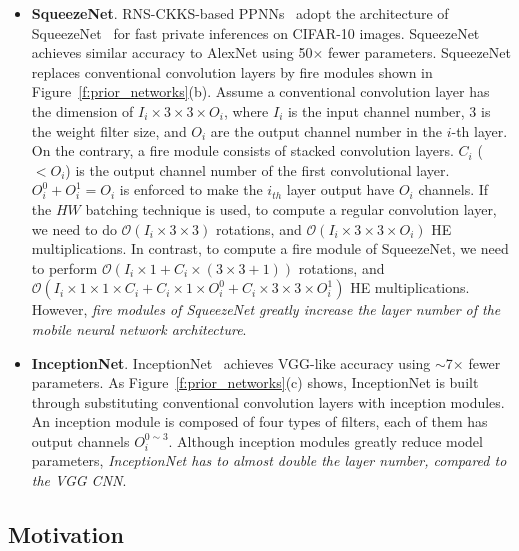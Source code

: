 \documentclass{article}
\begin{document}
\begin{itemize}[noitemsep,topsep=0pt,parsep=0pt,partopsep=0pt,leftmargin=*]


\item \textbf{SqueezeNet}. RNS-CKKS-based PPNNs~\cite{dathathri:2019PLDI,Dathathri:PLDI20:EVA} adopt the architecture of SqueezeNet~\cite{iandola2016squeezenet} for fast private inferences on CIFAR-10 images. SqueezeNet achieves similar accuracy to AlexNet using 50$\times$ fewer parameters. SqueezeNet replaces conventional convolution layers by fire modules shown in Figure~\ref{f:prior_networks}(b). Assume a conventional convolution layer has the dimension of $I_i\times 3 \times 3 \times O_i $, where $I_i$ is the input channel number, $3$ is the weight filter size, and $O_i$ are the output channel number in the $i$-th layer. On the contrary, a fire module consists of stacked convolution layers. $C_i$ ($<O_i$) is the output channel number of the first convolutional layer. $O_{i}^{0}+O_{i}^{1}=O_i$ is enforced to make the $i_{th}$ layer output have $O_i$ channels. If the $HW$ batching technique is used, to compute a regular convolution layer, we need to do $\mathcal{O}(I_i\times 3 \times 3 )$ rotations, and $\mathcal{O}(I_i\times 3 \times 3\times O_i)$ HE multiplications. In contrast, to compute a fire module of SqueezeNet, we need to perform $\mathcal{O}(I_i\times 1 +C_i\times (3 \times 3+1))$ rotations, and $\mathcal{O}(I_i \times 1 \times 1 \times C_i+ C_i \times 1 \times O_i^0+ C_i \times 3 \times 3\times O_i^1)$ HE multiplications. However, \textit{fire modules of SqueezeNet greatly increase the layer number of the mobile neural network architecture}.



\item \textbf{InceptionNet}. InceptionNet~\cite{szegedy2016inception} achieves VGG-like accuracy using $\sim$7$\times$ fewer parameters. As Figure~\ref{f:prior_networks}(c) shows, InceptionNet is built through substituting conventional convolution layers with inception modules. An inception module is composed of four types of filters, each of them has output channels $O_{i}^{0\sim 3}$. Although inception modules greatly reduce model parameters, \textit{InceptionNet has to almost double the layer number, compared to the VGG CNN}.
\end{itemize}



	
\subsection{Motivation}
\end{document}
